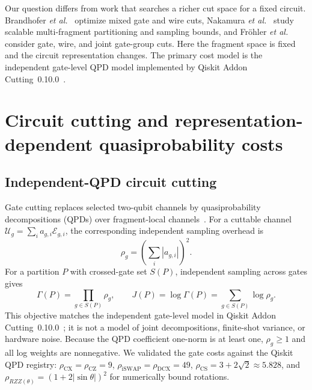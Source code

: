 \documentclass[
  aps,
  pra,
  reprint,
  amsmath,
  amssymb,
  longbibliography,
  nofootinbib,
  floatfix
]{revtex4-2}
\theoremstyle{plain}
\begin{document}
Our question differs from work that searches a richer cut space for a fixed circuit. Brandhofer \emph{et al.}~\cite{brandhofer2024} optimize mixed gate and wire cuts, Nakamura \emph{et al.}~\cite{nakamura2025} study scalable multi-fragment partitioning and sampling bounds, and Fr{\"o}hler \emph{et al.}~\cite{frohler2026} consider gate, wire, and joint gate-group cuts. Here the fragment space is fixed and the circuit representation changes. The primary cost model is the independent gate-level QPD model implemented by Qiskit Addon Cutting~0.10.0~\cite{qiskitcutting}.

\section{Circuit cutting and representation-dependent quasiprobability costs}
\label{sec:model}

\subsection{Independent-QPD circuit cutting}

Gate cutting replaces selected two-qubit channels by quasiprobability decompositions (QPDs) over fragment-local channels~\cite{peng2020,mitarai2021}. For a cuttable channel $\mathcal{U}_g=\sum_i a_{g,i}\mathcal{E}_{g,i}$, the corresponding independent sampling overhead is
\begin{equation}
  \rho_g = \left(\sum_i |a_{g,i}|\right)^{\!2}.
  \label{eq:gate-overhead}
\end{equation}
For a partition $P$ with crossed-gate set $S(P)$, independent sampling across gates gives
\begin{equation}
  \Gamma(P) = \prod_{g \in S(P)} \rho_g, \qquad
  J(P) = \log \Gamma(P) = \sum_{g \in S(P)} \log \rho_g.
  \label{eq:objective}
\end{equation}
This objective matches the independent gate-level model in Qiskit Addon Cutting~0.10.0~\cite{qiskitcutting}; it is not a model of joint decompositions, finite-shot variance, or hardware noise. Because the QPD coefficient one-norm is at least one, $\rho_g\geq1$ and all log weights are nonnegative. We validated the gate costs against the Qiskit QPD registry: $\rho_{\mathrm{CX}}=\rho_{\mathrm{CZ}}=9$, $\rho_{\mathrm{iSWAP}}=\rho_{\mathrm{DCX}}=49$, $\rho_{\mathrm{CS}}=3+2\sqrt{2}\approx5.828$, and $\rho_{RZZ(\theta)}=(1+2|\sin\theta|)^2$ for numerically bound rotations.
\end{document}
